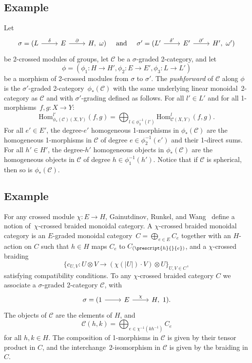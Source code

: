 \documentclass[a4paper, oneside]{amsart}
\numberwithin{equation}{subsection}
\theoremstyle{referencedlemma}
\theoremstyle{plain} %
\theoremstyle{remark}
\begin{document}
\subsection{Example}\label{pushforward}Let
$$
\begin{tikzcd}\sigma = (L\arrow[r, "\delta"] & E \arrow[r, "\partial"] & H, \ \omega)\end{tikzcd} \quad\text{and} \quad \begin{tikzcd}\sigma' = (L'\arrow[r, "\delta'"] & E' \arrow[r, "\partial'"] & H', \ \omega')\end{tikzcd}
$$
be 2-crossed modules of groups,  let $\mathcal{C}$ be a $\sigma$-graded 2-category, and let
$$
\phi = (\phi_1\colon H \to H', \phi_2\colon E\to E', \phi_3\colon L \to L')
$$
be a morphism of 2-crossed modules from $\sigma$ to $\sigma'$. The \emph{pushforward} of $\mathcal{C}$ along $\phi$ is the $\sigma'$-graded 2-category~$\phi_*(\mathcal{C})$ with the same underlying linear monoidal~2-category as $\mathcal{C}$ and with $\sigma'$-grading defined as follows. For all $l'\in L'$ and for all 1-morphisms~$f, g\colon X\to Y$:
$$
\mathrm{Hom}_{\phi_*(\mathcal{C})(X,Y)}^{l'}(f,g) =\!\!\! \bigoplus_{l\in \phi_3^{-1}(l')}\!\! \!\mathrm{Hom}_{\mathcal{C}(X,Y)}^l(f,g).
$$ 
For all $e'\in E'$, the degree-$e'$ homogeneous 1-morphisms in $\phi_*(\mathcal{C})$ are the homogeneous 1-morphisms in $\mathcal{C}$ of degree $e\in \phi_2^{-1}(e')$ and their 1-direct sums. For all $h'\in H'$, the degree-$h'$ homogeneous objects in $\phi_*(\mathcal{C})$ are the homogeneous objects in $\mathcal{C}$ of degree $h\in \phi_1^{-1}(h')$. Notice that if $\mathcal{C}$ is spherical, then so is $\phi_*(\mathcal{C})$.

\subsection{Example}For any crossed module $\chi\colon E\to H$, Gainutdinov, Runkel, and Wang~\cite{gainutdinov_constructions_2026} define a notion of~$\chi$-crossed braided monoidal category. A $\chi$-crossed braided monoidal category is an $E$-graded monoidal category~$C = \bigoplus_{e\in E}C_e$ together with an $H$-action on $C$ such that $h\in H$ maps $C_e$ to $C_{(\prescript{h}{}{e})}$, and a $\chi$-crossed braiding
$$
\{c_{U,V} \colon U\otimes V \to (\chi(\lvert U\rvert)\cdot V)\otimes U\}_{U,V \in C},
$$
satisfying compatibility conditions. To any $\chi$-crossed braided category $C$ we associate a $\sigma$-graded 2-category $\mathcal{C}$, with
$$
\begin{tikzcd}
\sigma = (1\arrow[r] & E\arrow[r, "\chi"] & H, \ 1).
\end{tikzcd}
$$
The objects of $\mathcal{C}$ are the elements of $H$, and 
$$
\mathcal{C}(h,k) =\!\!\!\!\! \bigoplus_{e \in \chi^{-1}(kh^{-1})}\!\!\!\!\! C_e
$$
for all $h,k\in H$. The composition of 1-morphisms in $\mathcal{C}$ is given by their tensor product in $C$, and the interchange~2-isomorphism in $\mathcal{C}$ is given by the braiding in $C$. 
\end{document}
